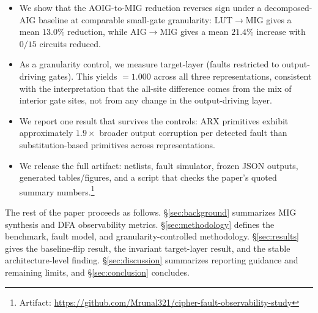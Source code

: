 \begin{itemize}
  \item We show that the AOIG-to-MIG \AvgDP{} reduction reverses sign
        under a decomposed-AIG baseline at comparable small-gate granularity:
        LUT$\to$MIG gives a mean $13.0\%$ reduction, while AIG$\to$MIG
        gives a mean $21.4\%$ increase with $0/15$ circuits reduced.
  \item As a granularity control, we measure target-layer \AvgDP{}
        (faults restricted to output-driving gates). This yields \AvgDP{}
        $=1.000$ across all three representations, consistent with the
        interpretation that the all-site difference comes from the mix of
        interior gate sites, not from any change in the output-driving
        layer.
  \item We report one result that survives the controls: ARX primitives exhibit
        approximately $1.9\times$ broader output corruption per detected
        fault than substitution-based primitives across representations.
  \item We release the full artifact: netlists, fault simulator, frozen
        JSON outputs, generated tables/figures, and a script that checks
        the paper's quoted summary numbers.\footnote{Artifact:
        \url{https://github.com/Mrunal321/cipher-fault-observability-study}}
\end{itemize}

The rest of the paper proceeds as follows. \S\ref{sec:background}
summarizes MIG synthesis and DFA observability metrics.
\S\ref{sec:methodology} defines the benchmark, fault model, and
granularity-controlled methodology. \S\ref{sec:results} gives the
baseline-flip result, the invariant target-layer result, and the stable
architecture-level finding. \S\ref{sec:discussion} summarizes
reporting guidance and remaining limits, and \S\ref{sec:conclusion}
concludes.
